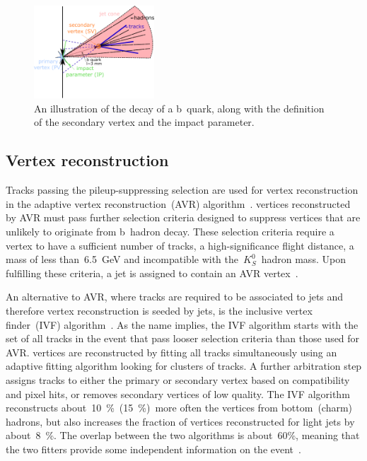 \begin{figure}
\begin{centering}
\includegraphics[width=0.4\textwidth]{figures/btv/ip.pdf}
\caption[Illustration of b~quark decay]{An illustration of the decay of a b~quark, along with the definition of the secondary vertex and the impact parameter.}
\label{fig:btag_ip}
\end{centering}
\end{figure}


\subsection{Vertex reconstruction}
Tracks passing the pileup-suppressing selection are used for vertex reconstruction in the adaptive vertex reconstruction~(AVR) algorithm~\cite{Waltenberger:2008zz}. vertices reconstructed by AVR must pass further selection criteria designed to suppress vertices that are unlikely to originate from b~hadron decay. These selection criteria require a vertex to have a sufficient number of tracks, a high-significance flight distance, a mass of less than~6.5~GeV and incompatible with the~$K_S^0$~hadron mass. Upon fulfilling these criteria, a jet is assigned to contain an AVR vertex~\cite{CMS-PAS-BTV-15-001}.

An alternative to AVR, where tracks are required to be associated to jets and therefore vertex reconstruction is seeded by jets, is the inclusive vertex finder~(IVF) algorithm~\cite{Khachatryan:2011wq}. As the name implies, the IVF algorithm starts with the set of all tracks in the event that pass looser selection criteria than those used for AVR. vertices are reconstructed by fitting all tracks simultaneously using an adaptive fitting algorithm looking for clusters of tracks. A further arbitration step assigns tracks to either the primary or secondary vertex based on compatibility and pixel hits, or removes secondary vertices of low quality. The IVF algorithm reconstructs about~10~\%~(15~\%)~more often the vertices from bottom~(charm) hadrons, but also increases the fraction of vertices reconstructed for light jets by about~8~\%. The overlap between the two algorithms is about~60\%, meaning that the two fitters provide some independent information on the event~\cite{CMS-PAS-BTV-15-001}.

